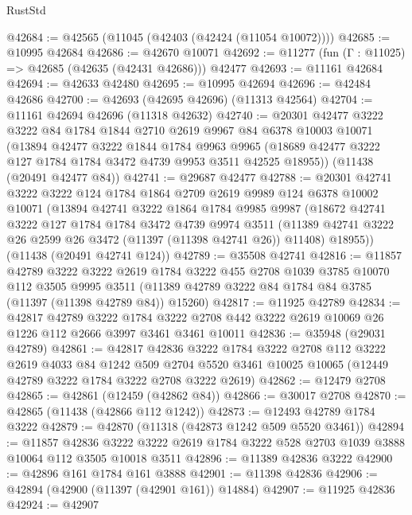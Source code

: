 \begin{lexlean}{RustStd}
\begin{coremodule}
@42684 := @42565 (@11045 (@42403 (@42424 (@11054 @10072))))
@42685 := @10995 @42684
@42686 := @42670 @10071
@42692 := @11277 (fun (Γ : @11025) => @42685 (@42635 (@42431 @42686))) @42477
@42693 := @11161 @42684
@42694 := @42633 @42480
@42695 := @10995 @42694
@42696 := @42484 @42686
@42700 := @42693 (@42695 @42696) (@11313 @42564)
@42704 := @11161 @42694 @42696 (@11318 @42632)
@42740 := @20301
    @42477
    @3222
    @3222
    @84
    @1784
    @1844
    @2710
    @2619
    @9967
    @84
    @6378
    @10003
    @10071
    (@13894
      @42477
      @3222
      @1844
      @1784
      @9963
      @9965
      (@18689 @42477 @3222 @127 @1784 @1784 @3472 @4739 @9953 @3511 @42525 @18955))
    (@11438 (@20491 @42477 @84))
@42741 := @29687 @42477
@42788 := @20301
    @42741
    @3222
    @3222
    @124
    @1784
    @1864
    @2709
    @2619
    @9989
    @124
    @6378
    @10002
    @10071
    (@13894
      @42741
      @3222
      @1864
      @1784
      @9985
      @9987
      (@18672
        @42741
        @3222
        @127
        @1784
        @1784
        @3472
        @4739
        @9974
        @3511
        (@11389 @42741 @3222 @26 @2599 @26 @3472 (@11397 (@11398 @42741 @26)) @11408)
        @18955))
    (@11438 (@20491 @42741 @124))
@42789 := @35508 @42741
@42816 := @11857
    @42789
    @3222
    @3222
    @2619
    @1784
    @3222
    @455
    @2708
    @1039
    @3785
    @10070
    @112
    @3505
    @9995
    @3511
    (@11389 @42789 @3222 @84 @1784 @84 @3785 (@11397 (@11398 @42789 @84)) @15260)
@42817 := @11925 @42789
@42834 := @42817
    @42789
    @3222
    @1784
    @3222
    @2708
    @442
    @3222
    @2619
    @10069
    @26
    @1226
    @112
    @2666
    @3997
    @3461
    @3461
    @10011
@42836 := @35948 (@29031 @42789)
@42861 := @42817
    @42836
    @3222
    @1784
    @3222
    @2708
    @112
    @3222
    @2619
    @4033
    @84
    @1242
    @509
    @2704
    @5520
    @3461
    @10025
    @10065
    (@12449 @42789 @3222 @1784 @3222 @2708 @3222 @2619)
@42862 := @12479 @2708
@42865 := @42861 (@12459 (@42862 @84))
@42866 := @30017 @2708
@42870 := @42865 (@11438 (@42866 @112 @1242))
@42873 := @12493 @42789 @1784 @3222
@42879 := @42870 (@11318 (@42873 @1242 @509 @5520 @3461))
@42894 := @11857
    @42836
    @3222
    @3222
    @2619
    @1784
    @3222
    @528
    @2703
    @1039
    @3888
    @10064
    @112
    @3505
    @10018
    @3511
@42896 := @11389 @42836 @3222
@42900 := @42896 @161 @1784 @161 @3888
@42901 := @11398 @42836
@42906 := @42894 (@42900 (@11397 (@42901 @161)) @14884)
@42907 := @11925 @42836
@42924 := @42907

\end{coremodule}
\end{lexlean}
